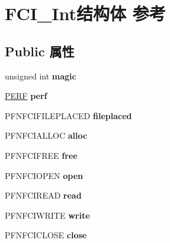 \hypertarget{struct_f_c_i___int}{}\section{F\+C\+I\+\_\+\+Int结构体 参考}
\label{struct_f_c_i___int}
\subsection*{Public 属性}
\begin{DoxyCompactItemize}
\item 
\mbox{\label{struct_f_c_i___int_ae2c561e92780eb3935421fc69aa58785}} 
unsigned int {\bfseries magic}
\item 
\mbox{\label{struct_f_c_i___int_a5c4d86bf976f22224a604c9e605abebe}} 
\hyperlink{struct_e_r_f}{P\+E\+RF} {\bfseries perf}
\item 
\mbox{\label{struct_f_c_i___int_a75213115bab513ed806fbb03e2a0c4ef}} 
P\+F\+N\+F\+C\+I\+F\+I\+L\+E\+P\+L\+A\+C\+ED {\bfseries fileplaced}
\item 
\mbox{\label{struct_f_c_i___int_a8dc83f385e682d570aae5243614b350b}} 
P\+F\+N\+F\+C\+I\+A\+L\+L\+OC {\bfseries alloc}
\item 
\mbox{\label{struct_f_c_i___int_a000713a63566659e4595a126312bb582}} 
P\+F\+N\+F\+C\+I\+F\+R\+EE {\bfseries free}
\item 
\mbox{\label{struct_f_c_i___int_a9bb7ff8055b1227fcb4241b2f9fb046c}} 
P\+F\+N\+F\+C\+I\+O\+P\+EN {\bfseries open}
\item 
\mbox{\label{struct_f_c_i___int_a68ecd49e9450cb1fb8b2170f66e6539e}} 
P\+F\+N\+F\+C\+I\+R\+E\+AD {\bfseries read}
\item 
\mbox{\label{struct_f_c_i___int_a0b04789a65aaea539f0922da40f38f1d}} 
P\+F\+N\+F\+C\+I\+W\+R\+I\+TE {\bfseries write}
\item 
\mbox{\label{struct_f_c_i___int_a8820b505b547feaab0f643a6057569d9}} 
P\+F\+N\+F\+C\+I\+C\+L\+O\+SE {\bfseries close}

\end{DoxyCompactItemize}
